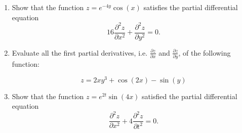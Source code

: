 \documentclass[a4paper,12pt]{article}
\begin{document}
\begin{enumerate}
\item 
	Show that the function $z=e^{-4y}\cos(x)$ satisfies the partial differential equation
	\[ 16\frac{\partial^2 z}{\partial x^2} + \frac{\partial^2 z}{\partial y^2} = 0. \]
	
\item Evaluate all the first partial derivatives, i.e. $\frac{\partial z}{\partial x}$ and $\frac{\partial z}{\partial y} $, 
of the following function:

\[ z = 2xy^3 + \cos(2x) - \sin(y) \]

 \item 
 Show that the function $z=e^{2t}\sin(4x)$ satisfied the partial differential equation
 \[ \frac{\partial^2 z}{\partial x^2} +  4\frac{\partial^2 z}{\partial t^2} = 0. \]


\end{enumerate}
\end{document}
